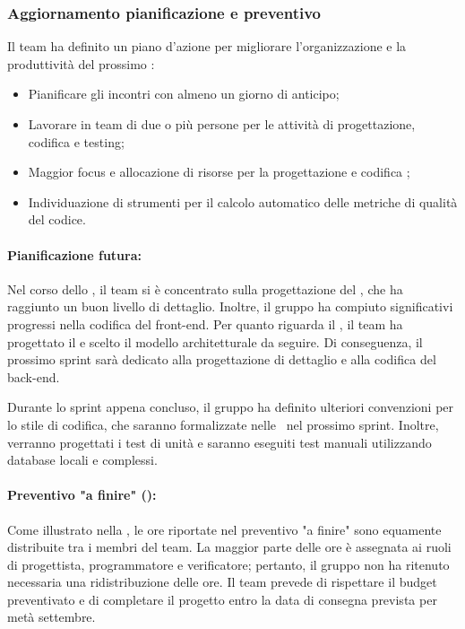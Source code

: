 \subsubsection{Aggiornamento pianificazione e preventivo}
\par Il team ha definito un piano d'azione per migliorare l'organizzazione e la produttività del prossimo :
\begin{itemize}
  \item Pianificare gli incontri con almeno un giorno di anticipo;
  \item Lavorare in team di due o più persone per le attività di progettazione, codifica e testing;
  \item Maggior focus e allocazione di risorse per la progettazione e codifica ;
  \item Individuazione di strumenti per il calcolo automatico delle metriche di qualità del codice.
\end{itemize}

\paragraph*{Pianificazione futura:}
\par Nel corso dello , il team si è concentrato sulla progettazione del , che ha raggiunto un buon livello di dettaglio. Inoltre, il gruppo ha compiuto significativi progressi nella codifica del front-end. Per quanto riguarda il , il team ha progettato il  e scelto il modello architetturale da seguire. Di conseguenza, il prossimo sprint sarà dedicato alla progettazione di dettaglio e alla codifica del back-end.

\par Durante lo sprint appena concluso, il gruppo ha definito ulteriori convenzioni per lo stile di codifica, che saranno formalizzate nelle \NdP\ nel prossimo sprint. Inoltre, verranno progettati i test di unità e saranno eseguiti test manuali utilizzando database locali e  complessi.

\paragraph*{Preventivo "a finire" ():}
\par Come illustrato nella , le ore riportate nel preventivo "a finire" sono equamente distribuite tra i membri del team. La maggior parte delle ore è assegnata ai ruoli di progettista, programmatore e verificatore; pertanto, il gruppo non ha ritenuto necessaria una ridistribuzione delle ore. Il team prevede di rispettare il budget preventivato e di completare il progetto entro la data di consegna prevista per metà settembre.

